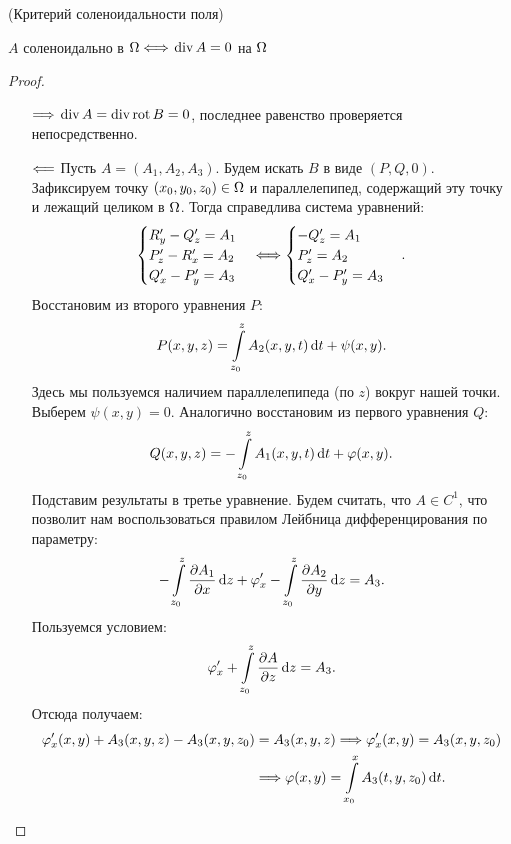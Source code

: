 \begin{theorem}(Критерий соленоидальности поля)
    
    $A$ соленоидально в $\Omega \Longleftrightarrow$ $\operatorname{div} A = 0$ на $\Omega$
\end{theorem}
\begin{proof}
    \enewline
    \begin{itemize}
        \item[$\Longrightarrow$] $\operatorname{div}{A} = \operatorname{div}{\operatorname{rot}{B}} = 0$, последнее равенство проверяется непосредственно.
        \item[$\Longleftarrow$] Пусть $A = (A_1, A_2, A_3)$. Будем искать $B$ в виде $(P, Q, 0)$. Зафиксируем точку
            $(x_0, y_0, z_0) \in \Omega$ и параллелепипед, содержащий эту точку и лежащий целиком в $\Omega$.
            Тогда справедлива система уравнений:
            \[
                \begin{cases}
                    R'_y - Q'_z = A_1 \\
                    P'_z - R'_x = A_2 \\
                    Q'_x - P'_y = A_3 
                \end{cases} \Longleftrightarrow
                \begin{cases}
                    -Q'_z = A_1 \\
                    P'_z = A_2 \\
                    Q'_x - P'_y = A_3
                \end{cases}
            .\]
            Восстановим из второго уравнения $P$:
            \[
                P(x, y, z) = \int\limits_{z_0}^z{A_2(x, y, t) \,\mathrm{d} t} + \psi(x, y)
            .\]
            Здесь мы пользуемся наличием параллелепипеда (по $z$) вокруг нашей точки. Выберем $\psi(x, y) = 0$. 
            Аналогично восстановим из первого уравнения $Q$:
            \[
                Q(x, y, z) = -\int\limits_{z_0}^z{A_1(x, y, t) \,\mathrm{d} t} + \varphi(x, y)
            .\]
            Подставим результаты в третье уравнение. Будем считать, что $A \in C^1$, 
            что позволит нам воспользоваться правилом Лейбница дифференцирования по параметру:
            \[
                -\int\limits_{z_0}^z{\dfrac{\partial A_1}{\partial x} \,\mathrm{d} z} + \varphi'_x - \int\limits_{z_0}^z{\dfrac{\partial A_2}{\partial y} \,\mathrm{d} z} = A_3
            .\]
            Пользуемся условием:
            \[
                \varphi'_x + \int\limits_{z_0}^z{\dfrac{\partial A}{\partial z} \,\mathrm{d} z} = A_3
            .\]
            Отсюда получаем:
            \begin{align*}
                \varphi'_x(x, y) + A_3(x, y, z) - A_3(x, y, z_0) &= A_3(x, y, z) \Longrightarrow
                \varphi'_x(x, y) = A_3(x, y, z_0) \\
                &\Longrightarrow \varphi(x, y) = \int\limits_{x_0}^x{A_3(t, y, z_0) \,\mathrm{d} t}
            .\end{align*}
    \end{itemize}
\end{proof}

